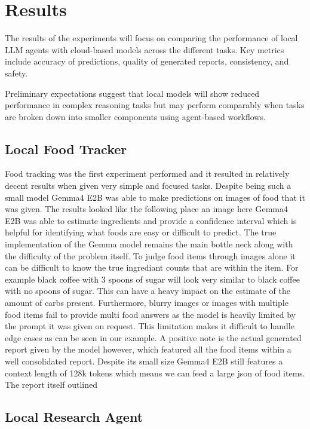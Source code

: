 \documentclass[sigconf]{acmart}
\begin{document}
\section{Results}

The results of the experiments will focus on comparing the performance of local LLM agents with cloud-based models across the different tasks. Key metrics include accuracy of predictions, quality of generated reports, consistency, and safety.

Preliminary expectations suggest that local models will show reduced performance in complex reasoning tasks but may perform comparably when tasks are broken down into smaller components using agent-based workflows.

\subsection{Local Food Tracker}
Food tracking was the first experiment performed and it resulted in relatively decent results when given very simple and focused tasks. Despite being such a small model Gemma4 E2B was able to make predictions on images of food that it was given. The results looked like the following
{place an image here}
Gemma4 E2B was able to estimate ingredients and provide a confidence interval which is helpful for identifying what foods are easy or difficult to predict. The true implementation of the Gemma model remains the main bottle neck along with the difficulty of the problem itself.
To judge food items through images alone it can be difficult to know the true ingrediant counts that are within the item. For example black coffee with 3 spoons of sugar will look very similar to black coffee with no spoons of sugar. This can have a heavy impact on the estimate of the amount of carbs present.
Furthermore, blurry images or images with multiple food items fail to provide multi food answers as the model is heavily limited by the prompt it was given on request. This limitation makes it difficult to handle edge cases as can be seen in our example.
A positive note is the actual generated report given by the model however, which featured all the food items within a well consolidated report. Despite its small size Gemma4 E2B still features a context length of 128k tokens which means we can feed a large json of food items. The report itself outlined 


\subsection{Local Research Agent}
\end{document}
